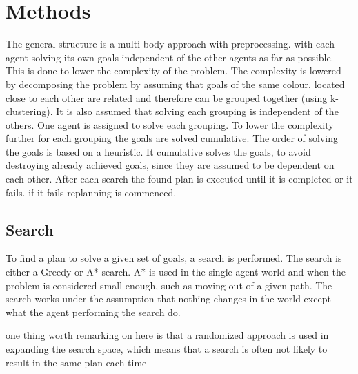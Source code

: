 \documentclass[letterpaper]{article}
\begin{document}
\section{Methods}
%		
%		
%		
		The general structure is a multi body approach with preprocessing. with each agent solving its own goals independent of the other agents as far as possible. This is done to lower the complexity of the problem. The complexity is lowered by decomposing the problem by assuming that goals of the same colour, located close to each other are related and therefore can be grouped together (using k-clustering). It is also assumed that solving each grouping is independent of the others. One agent is assigned to solve each grouping. 
		To lower the complexity further for each grouping the goals are solved cumulative. The order of solving the goals is based on a heuristic. It cumulative solves the goals, to avoid destroying already achieved goals, since they are assumed to be dependent on each other. After each search the found plan is executed until it is completed or it fails. if it fails replanning is commenced.

 
				
	\subsection{Search}
		To find a plan to solve a given set of goals, a search is performed. The search is either a Greedy or A* search. A* is used in the single agent world and when the problem is considered small enough, such as moving out of a given path. 
		The search works under the assumption that nothing changes in the world except what the agent performing the search do.
		
		one thing worth remarking on here is that a randomized approach is used in expanding the search space, which means that a search is often not likely to result in the same plan each time
\end{document}
